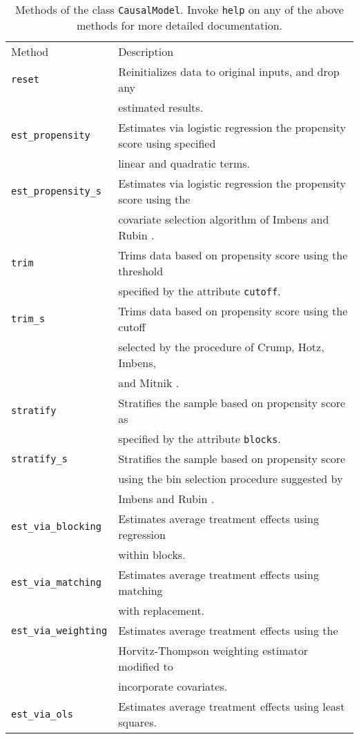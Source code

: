 \documentclass[12pt]{article}
\theoremstyle{definition}
\theoremstyle{definition}
\theoremstyle{definition}
\theoremstyle{remark}
\begin{document}
\begin{table}[h]
\begin{center}\begin{tabular}{ll}
Method & Description \\
\texttt{reset} & Reinitializes data to original inputs, and drop any \\
& estimated results. \\
\texttt{est\_propensity} & Estimates via logistic regression the propensity score using specified \\
& linear and quadratic terms. \\
\texttt{est\_propensity\_s} & Estimates via logistic regression the propensity score using the \\
& covariate selection algorithm of Imbens and Rubin \citeyear{ImbensRubin.2015}. \\
\texttt{trim} & Trims data based on propensity score using the threshold \\
& specified by the attribute \texttt{cutoff}. \\
\texttt{trim\_s} & Trims data based on propensity score using the cutoff \\
& selected by the procedure of Crump, Hotz, Imbens, \\
& and Mitnik \citeyear{CrumpHotzImbensMitnik.2009}. \\
\texttt{stratify} & Stratifies the sample based on propensity score as \\
& specified by the attribute \texttt{blocks}. \\
\texttt{stratify\_s} & Stratifies the sample based on propensity score \\
& using the bin selection procedure suggested by \\
& Imbens and Rubin \citeyear{ImbensRubin.2015}. \\
\texttt{est\_via\_blocking} & Estimates average treatment effects using regression \\
& within blocks. \\
\texttt{est\_via\_matching} & Estimates average treatment effects using matching \\
& with replacement. \\
\texttt{est\_via\_weighting} & Estimates average treatment effects using the \\
& Horvitz-Thompson weighting estimator modified to \\
& incorporate covariates. \\
\texttt{est\_via\_ols} & Estimates average treatment effects using least squares.
\end{tabular}\end{center}
\caption{Methods of the class \texttt{CausalModel}. Invoke \texttt{help} on any of the above methods for more detailed documentation.}  \label{tab.b}
\end{table}
\end{document}
